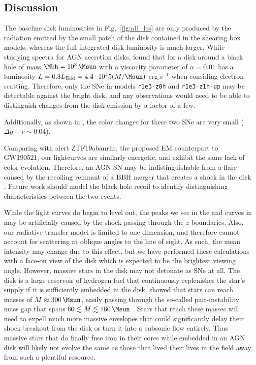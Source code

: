 \subsection{Discussion} \label{sec:discussion}

The baseline disk luminosities in Fig.~\ref{fig:all_lcs} are only produced by the radiation emitted by the small patch of the disk contained in the shearing box models, whereas the full integrated disk luminosity is much larger.
While studying spectra for AGN accretion disks, \citet{Hubeny+01} found that for a disk around a black hole of mass $\Mbh=10^8\,\Msun$ with a viscocity parameter of $\alpha=0.01$ has a luminosity $L=0.3L_\text{Edd}=4.4\cdot10^45(M/\Msun)$ erg s$^{-1}$ when considing electron scatting.
Therefore, only the SNe in models \texttt{r1e3-z0h} and \texttt{r1e3-z1h-up} may be detectable against the bright disk, and any observations would need to be able to distinguish changes from the disk emission by a factor of a few.

Additionally, as shown in , the color changes for these two SNe are very small ($\Delta g-r \sim 0.04$).



Comparing with alert ZTF19abanrhr, the proposed EM counterpart to GW190521, our lightcurves are similarly energetic, and exhibit the same lack of color evolution.
Therefore, an AGN-SN may be indistinguishable from a flare caused by the recoiling remnant of a BBH merger that creates a shock in the disk \citep{McKernan+19}. 
Future work should model the black hole recoil to identify distinguishing characteristics between the two events.

While the light curves do begin to level out, the peaks we see in the  and  curves in  may be artificially caused by the shock passing through the $z$ boundaries.
Also, our radiative transfer model is limited to one dimension, and therefore cannot account for scattering at oblique angles to the line of sight.
As such, the mean intensity may change due to this effect, but we have performed these calculations with a face-on view of the disk which is expected to be the brightest viewing angle.
However, massive stars in the disk may not detonate as SNe at all.
The disk is a large reservoir of hydrogen fuel that continuously replenishes the star's supply if it is sufficiently embedded in the disk.
\citet{CantielloJermynLin21} showed that stars can reach masses of $M\approx300\,\Msun$, easily passing through the so-called pair-instability mass gap that spans $60\lesssim M \lesssim 160\,\Msun$ \citep{WoosleyHeger21}.
Stars that reach these masses will need to expell much more massive envelopes that could significantly delay their shock breakout from the disk or turn it into a subsonic flow entirely.
Thus massive stars that do finally fuse iron in their cores while embedded in an AGN disk will likely not evolve the same as those that lived their lives in the field away from such a plentiful resource.

